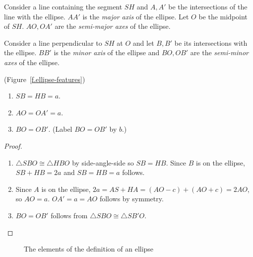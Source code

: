 
\begin{definition}\label{def.features}
Consider a line containing the segment $SH$ and $A,A'$ be the intersections of the line with the ellipse. $AA'$ is the \emph{major axis} of the ellipse. Let $O$ be the midpoint of $SH$. $AO,OA'$ are the \emph{semi-major axes} of the ellipse.

Consider a line perpendicular to $SH$ at $O$ and let $B,B'$ be its intersections with the ellipse. $BB'$ is the \emph{minor axis} of the ellipse and $BO,OB'$ are the \emph{semi-minor axes} of the ellipse.
\end{definition}

\begin{theorem}(Figure~\ref{f.ellipse-features})\label{thm.ellipses-features}
\begin{enumerate}
\item $SB=HB=a$.
\item $AO=OA'=a$.
\item $BO=OB'$. (Label $BO=OB'$ by $b$.)
\end{enumerate}
\end{theorem}

\begin{proof}
\begin{enumerate}
\item $\triangle SBO\cong\triangle HBO$ by side-angle-side  so $SB=HB$. Since $B$ is on the ellipse, $SB+HB=2a$ and $SB=HB=a$ follows. 
\item Since $A$ is on the ellipse, $2a = AS+HA = (AO-c)+(AO+c)=2AO$,
so $AO=a$. $OA'=a=AO$ follows by symmetry.
\item $BO=OB'$ follows from $\triangle SBO\cong\triangle SB'O$.\hqed
\end{enumerate}
\end{proof}

\begin{figure}[t]
\begin{center}
\end{center}
\caption{The elements of the definition of an ellipse}\label{f.ellipse-conic}
\end{figure}

